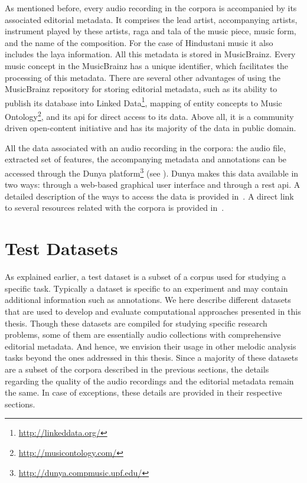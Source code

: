 As mentioned before, every audio recording in the corpora is accompanied by its associated editorial metadata. It comprises the lead artist, accompanying artists, instrument played by these artists, \gls{raga} and \gls{tala} of the music piece, music form, and the name of the composition. For the case of Hindustani music it also includes the \gls{laya} information. All this metadata is stored in MusicBrainz. Every music concept in the MusicBrainz has a unique identifier, which facilitates the processing of this metadata. There are several other advantages of using the MusicBrainz repository for storing editorial metadata, such as its ability to publish its database into Linked Data\footnote{\url{http://linkeddata.org/}}, mapping of entity concepts to Music Ontology\footnote{\url{http://musicontology.com/}}, and its \acrshort{api} for direct access to its data. Above all, it is a community driven open-content initiative and has its majority of the data in public domain.

All the data associated with an audio recording in the corpora: the audio file, extracted set of features, the accompanying metadata and annotations can be accessed through the Dunya platform\footnote{\url{http://dunya.compmusic.upf.edu/}} (see ). Dunya makes this data available in two ways: through a web-based graphical user interface and through a \acrshort{rest} \acrshort{api}. A detailed description of the ways to access the data is provided in~. A direct link to several resources related with the corpora is provided in~.


\section{Test Datasets}
\label{sec:corpus_test_datasets}

As explained earlier, a test dataset is a subset of a corpus used for studying a specific task. Typically a dataset is specific to an experiment and may contain additional information such as annotations. We here describe different datasets that are used to develop and evaluate computational approaches presented in this thesis. Though these datasets are compiled for studying specific research problems, some of them are essentially audio collections with comprehensive editorial metadata. And hence, we envision their usage in other melodic analysis tasks beyond the ones addressed in this thesis. Since a majority of these datasets are a subset of the corpora described in the previous sections, the details regarding the quality of the audio recordings and the editorial metadata remain the same. In case of exceptions, these details are provided in their respective sections. 


